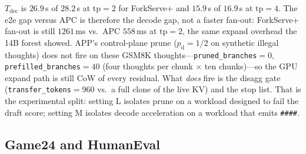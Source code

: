\documentclass[11pt,a4paper]{article}
\begin{document}
$T_{\mathrm{dec}}$ is $26.9$\,s of $28.2$\,s at $\mathrm{tp}{=}2$ for ForkServe+ and $15.9$\,s of $16.9$\,s at $\mathrm{tp}{=}4$.
The e2e gap versus APC is therefore the decode gap, not a faster fan-out: ForkServe+ fan-out is still $1261$\,ms vs.\ APC $558$\,ms at $\mathrm{tp}{=}2$, the same expand overhead the 14B forest showed.
APP's control-plane prune ($p_{\mathrm{d}}{=}1/2$ on synthetic illegal thoughts) does not fire on these GSM8K thoughts---\texttt{pruned\_branches}${=}0$, \texttt{prefilled\_branches}${=}40$ (four thoughts per chunk $\times$ ten chunks)---so the GPU expand path is still CoW of every residual.
What \emph{does} fire is the disagg gate (\texttt{transfer\_tokens}${=}960$ vs.\ a full clone of the live KV) and the stop list.
That is the experimental split: setting L isolates prune on a workload designed to fail the draft score; setting M isolates decode acceleration on a workload that emits \texttt{\#\#\#\#}.

\subsection{Game24 and HumanEval}

\begin{table}[h]
\centering
\small
{}
\caption{Setting M, Game24 and HumanEval, $n{=}80$.
Peak ratios vs.\ APC: Game24 $793/1289{=}0.62$, HumanEval $1882/1970{=}0.96$ (wrap-dominated, $k{=}2$), matching \eqref{eq:gap}.
Decode tokens barely move, so e2e stays within $1\%$ of APC.
Game24 success under ForkServe+ is lower than ForkServe at both widths; HumanEval pass@1 is matched at $\mathrm{tp}{=}2$ and $-3$ problems at $\mathrm{tp}{=}4$.}
\end{table}
\end{document}
